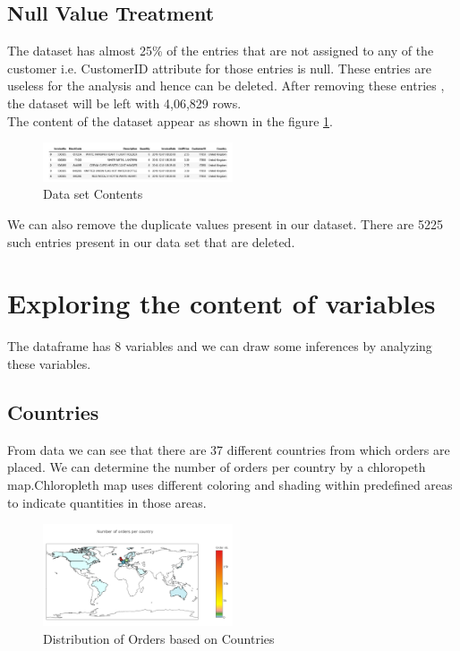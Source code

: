 \subsection*{Null Value Treatment}

The dataset has almost 25\% of the entries that are not assigned to any of the customer i.e. CustomerID attribute for those entries is null. These entries are useless for the analysis and hence can be deleted. After removing these entries , the dataset will be left with 4,06,829 rows.\\

The content of the dataset appear as shown in the figure \ref{data}.

\begin{figure}[h]
\caption{Data set Contents}
\label{data}
\centering
\includegraphics[width=0.5\textwidth]{images/DatasetContent.PNG}
\end{figure}

We can also remove the duplicate values present in our dataset. There are 5225 such entries present in our data set that are deleted.\\

\section{Exploring the content of variables}

The dataframe has 8 variables and we can draw some inferences by analyzing these variables.

\subsection*{Countries}

From data we can see that there are 37 different countries from which orders are placed. We can determine the number of orders per country by a chloropeth map.Chloropleth map uses different coloring and shading within predefined areas to indicate quantities in those areas. \\

\begin{figure}[h]
\caption{Distribution of Orders based on Countries}
\label{country}
\centering
\includegraphics[width=0.5\textwidth]{images/chloropleth.PNG}
\end{figure}

